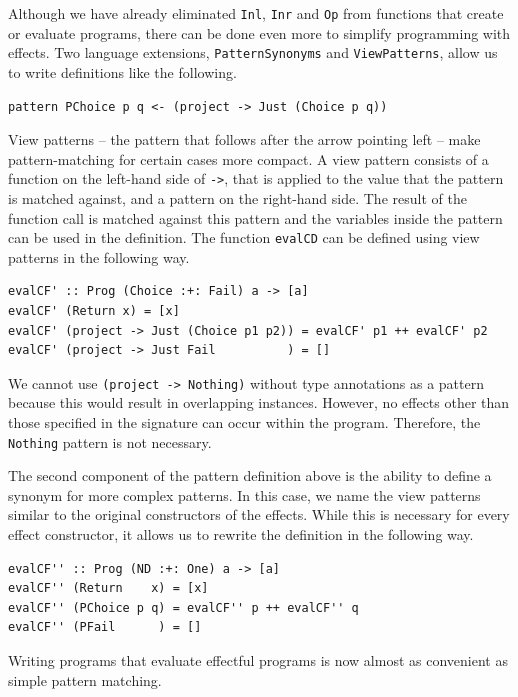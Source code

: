 \documentclass[a4paper, 11pt, fleqn, twoside, abstract=on]{scrreprt}
\newcommand{\hinl}[1]{\texttt{#1}}
\begin{document}
Although we have already eliminated \hinl{Inl}, \hinl{Inr} and \hinl{Op} from functions that create or evaluate programs, there can be done even more to simplify programming with effects.
Two language extensions, \hinl{PatternSynonyms} and \hinl{ViewPatterns}, allow us to write definitions like the following.

\begin{verbatim}
pattern PChoice p q <- (project -> Just (Choice p q))
\end{verbatim}

View patterns -- the pattern that follows after the arrow pointing left -- make pattern-matching for certain cases more compact.
A view pattern consists of a function on the left-hand side of \hinl{->}, that is applied to the value that the pattern is matched against, and a pattern on the right-hand side.
The result of the function call is matched against this pattern and the variables inside the pattern can be used in the definition.
The function \hinl{evalCD} can be defined using view patterns in the following way.

\begin{verbatim}
evalCF' :: Prog (Choice :+: Fail) a -> [a]
evalCF' (Return x) = [x]
evalCF' (project -> Just (Choice p1 p2)) = evalCF' p1 ++ evalCF' p2
evalCF' (project -> Just Fail          ) = []
\end{verbatim}

We cannot use \hinl{(project -> Nothing)} without type annotations as a pattern because this would result in overlapping instances.
However, no effects other than those specified in the signature can occur within the program.
Therefore, the \hinl{Nothing} pattern is not necessary.

The second component of the pattern definition above is the ability to define a synonym for more complex patterns.
In this case, we name the view patterns similar to the original constructors of the effects.
While this is necessary for every effect constructor, it allows us to rewrite the definition in the following way.

\begin{verbatim}
evalCF'' :: Prog (ND :+: One) a -> [a]
evalCF'' (Return    x) = [x]
evalCF'' (PChoice p q) = evalCF'' p ++ evalCF'' q
evalCF'' (PFail      ) = []
\end{verbatim}

Writing programs that evaluate effectful programs is now almost as convenient as simple pattern matching.
\end{document}

